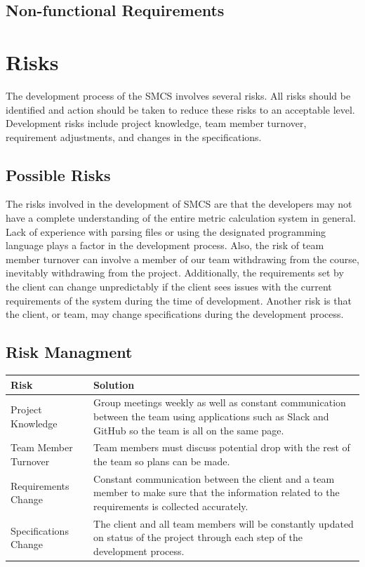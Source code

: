 \documentclass{scrreprt}
\begin{document}
	\section{Non-functional Requirements}
	\chapter{Risks}
	The development process of the SMCS involves several risks. All risks should be identified and action should be taken to reduce these risks to an acceptable level. Development risks include project knowledge, team member turnover, requirement adjustments, and changes in the specifications.
	\section{Possible Risks}
	The risks involved in the development of SMCS are that the developers may not have a complete understanding of the entire metric calculation system in general. Lack of experience with parsing files or using the designated programming language plays a factor in the development process. Also, the risk of team member turnover can involve a member of our team withdrawing from the course, inevitably withdrawing from the project. Additionally, the requirements set by the client can change unpredictably if the client sees issues with the current requirements of the system during the time of development. Another risk is that the client, or team, may change specifications during the development process.
	\section{Risk Managment}
	\begin{tabular}{|p{5cm}|p{9cm}|}
		\hline 
		Risk & Solution \\ 
		\hline 
		Project Knowledge &  Group meetings weekly as well as constant communication between the team using applications such as Slack and GitHub so the team is all on the same page.\\ 
		\hline 
		Team Member Turnover & Team members must discuss potential drop with the rest of the team so plans can be made.\\ 
		\hline 
		Requirements Change & Constant communication between the client and a team member to make sure that the information related to the requirements is collected accurately.\\ 
		\hline 
		Specifications Change & The client and all team members will be constantly updated on status of the project through each step of the development process. \\ 
		\hline 
	\end{tabular} 
\end{document}
